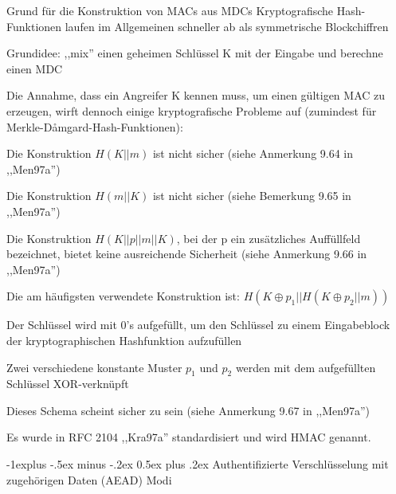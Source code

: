 \documentclass[a4paper]{article}
\makeatletter
\renewcommand{\subsection}{\@startsection{subsection}{2}{0mm}%
 {-1explus -.5ex minus -.2ex}%
 {0.5ex plus .2ex}%
 {\normalfont\normalsize\bfseries}}
\makeatother
\begin{document}
\begin{multicols}{3}
      \begin{itemize*}
            \item Grund für die Konstruktion von MACs aus MDCs Kryptografische
            Hash-Funktionen laufen im Allgemeinen schneller ab als symmetrische
            Blockchiffren
            \item Grundidee: ,,mix'' einen geheimen Schlüssel K mit der Eingabe und
            berechne einen MDC
            \item Die Annahme, dass ein Angreifer K kennen muss, um einen gültigen MAC
            zu erzeugen, wirft dennoch einige kryptografische Probleme auf
            (zumindest für Merkle-Dåmgard-Hash-Funktionen):
            \begin{itemize*}
                  \item Die Konstruktion $H(K|| m)$ ist nicht sicher (siehe Anmerkung 9.64 in ,,Men97a'')
                  \item Die Konstruktion $H(m|| K)$ ist nicht sicher (siehe Bemerkung 9.65 in ,,Men97a'')
                  \item Die Konstruktion $H(K|| p|| m|| K)$, bei der p ein zusätzliches Auffüllfeld bezeichnet, bietet keine ausreichende Sicherheit (siehe Anmerkung 9.66 in ,,Men97a'')
            \end{itemize*}
            \item Die am häufigsten verwendete Konstruktion ist:
            $H(K\oplus p_1||
                  H(K\oplus p_2|| m))$
            \begin{itemize*}
                  \item Der Schlüssel wird mit 0's aufgefüllt, um den Schlüssel zu einem Eingabeblock der kryptographischen Hashfunktion aufzufüllen
                  \item Zwei verschiedene konstante Muster $p_1$ und $p_2$ werden mit dem aufgefüllten Schlüssel XOR-verknüpft
                  \item Dieses Schema scheint sicher zu sein (siehe Anmerkung 9.67 in ,,Men97a'')
                  \item Es wurde in RFC 2104 ,,Kra97a'' standardisiert und wird HMAC genannt.
            \end{itemize*}
      \end{itemize*}


      \subsection{Authentifizierte Verschlüsselung mit zugehörigen Daten
            (AEAD)
            Modi}


\end{multicols}
\end{document}
